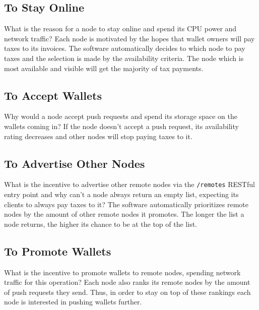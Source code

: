 \documentclass[11pt,oneside]{article}
\newcommand\dd[1]{\colorbox{gray!30}{\texttt{#1}}}
\begin{document}
\subsection{To Stay Online}

What is the reason for a node to stay online and spend its CPU power
and network traffic? Each node is motivated by the
hopes that wallet owners will pay taxes to its invoices. The software
automatically decides to which node to pay taxes and the selection is
made by the availability criteria. The node which is most available
and visible will get the majority of tax payments.

\subsection{To Accept Wallets}

Why would a node accept push requests and spend its storage space
on the wallets coming in? If the node doesn't accept a push request,
its availability rating decreases and other nodes will stop paying
taxes to it.

\subsection{To Advertise Other Nodes}

What is the incentive to advertise other remote nodes via the \dd{/remotes} RESTful
entry point and why can't a node always return an empty list, expecting its clients
to always pay taxes to it? The software automatically prioritizes remote
nodes by the amount of other remote nodes it promotes. The longer the list a node
returns, the higher its chance to be at the top of the list.

\subsection{To Promote Wallets}

What is the incentive to promote wallets to remote nodes, spending network
traffic for this operation? Each node also ranks its remote nodes by the
amount of push requests they send. Thus, in order to stay on top of these rankings
each node is interested in pushing wallets further.


\end{document}
